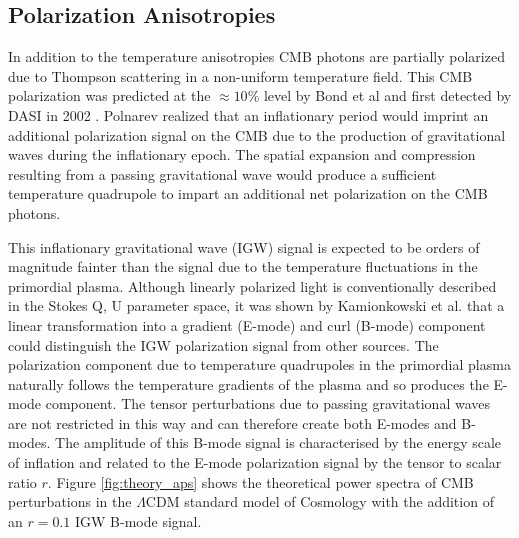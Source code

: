 \documentclass[12pt]{article}
\begin{document}
\subsection{Polarization Anisotropies}
In addition to the temperature anisotropies CMB photons are partially
polarized due to Thompson scattering in a non-uniform temperature field. This
CMB polarization was predicted at the $\approx 10\%$ level by Bond et al
\cite{cite:Bond} and first detected by DASI in 2002 \cite{cite:DASI}. Polnarev
\cite{cite:Polnarev} realized that an inflationary period would imprint an
additional polarization signal on the CMB due to the production of
gravitational waves during the inflationary epoch. The spatial expansion and
compression resulting from a passing gravitational wave would produce a
sufficient temperature quadrupole to impart an additional net polarization on the CMB
photons.



This inflationary gravitational wave (IGW) signal is expected to be orders of
magnitude fainter than the signal due to the temperature fluctuations in the
primordial plasma. Although linearly polarized light is conventionally
described in the Stokes Q, U parameter space, it was shown by Kamionkowski et
al.  \cite{cite:Kamionkowski} that a linear transformation into 
a gradient (E-mode) and curl (B-mode) component could distinguish the
IGW polarization signal from other sources. The
polarization component due to temperature quadrupoles in the primordial plasma
naturally follows the temperature gradients of the plasma and so produces the
E-mode component. The tensor perturbations due to passing gravitational waves
are not restricted in this way and can therefore create both E-modes and
B-modes. The amplitude of this B-mode signal is characterised by the energy
scale of inflation and related to the E-mode polarization signal by the tensor
to scalar ratio $r$.  Figure \ref{fig:theory_aps} shows the theoretical power
spectra of CMB perturbations in the $\Lambda$CDM standard model of Cosmology
with the addition of an $r=0.1$ IGW B-mode signal. 
\end{document}
